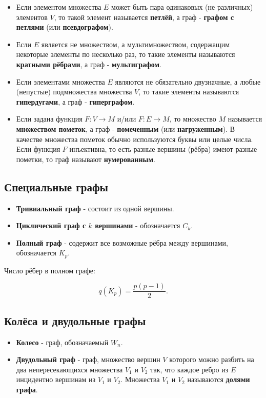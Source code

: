 {\begin{itemize}
    \item Если элементом множества $E$ может быть пара одинаковых (не различных) элементов $V$, то такой элемент называется \textbf{петлёй}, а граф - \textbf{графом с петлями} (или \textbf{псевдографом}).
    \item Если $E$ является не множеством, а мультимножеством, содержащим некоторые элементы по несколько раз, то такие элементы называются \textbf{кратными рёбрами}, а граф - \textbf{мультиграфом}.
    \item Если элементами множества $E$ являются не обязательно двузначные, а любые (непустые) подмножества множества $V$, то такие элементы называются \textbf{гипердугами}, а граф - \textbf{гиперграфом}.
    \item Если задана функция $F: V \to M$ и/или $F: E \to M$, то множество $M$ называется \textbf{множеством пометок}, а граф - \textbf{помеченным} (или \textbf{нагруженным}). В качестве множества пометок обычно используются буквы или целые числа. Если функция $F$ инъективна, то есть разные вершины (рёбра) имеют разные пометки, то граф называют \textbf{нумерованным}.
\end{itemize}

\subsection*{Специальные графы}

\begin{itemize}
    \item \textbf{Тривиальный граф} - состоит из одной вершины.
    \item \textbf{Циклический граф с $k$ вершинами} - обозначается $C_k$.
    \item \textbf{Полный граф} - содержит все возможные рёбра между вершинами, обозначается $K_p$.
\end{itemize}

Число рёбер в полном графе:


\[
q(K_p) = \frac{p(p - 1)}{2}.
\]



\subsection*{Колёса и двудольные графы}

\begin{itemize}
    \item \textbf{Колесо} - граф, обозначаемый $W_n$.
    \item \textbf{Двудольный граф} - граф, множество вершин $V$ которого можно разбить на два непересекающихся множества $V_1$ и $V_2$ так, что каждое ребро из $E$ инцидентно вершинам из $V_1$ и $V_2$. Множества $V_1$ и $V_2$ называются \textbf{долями графа}.
\end{itemize}

}

